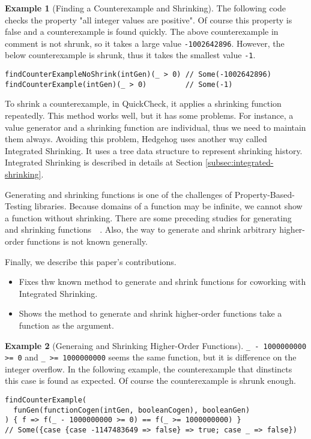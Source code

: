 \documentclass[a4paper,10pt]{article}
\theoremstyle{definition}
\newtheorem{example}{Example}
\begin{document}
\begin{example}[Finding a Counterexample and Shrinking]
The following code checks the property "all integer values are positive".
Of course this property is false and a counterexample is found quickly.
The above counterexample in comment is not shrunk, so it takes a large value \texttt{-1002642896}.
However, the below counterexample is shrunk, thus it takes the smallest value \texttt{-1}.

\begin{verbatim}
findCounterExampleNoShrink(intGen)(_ > 0) // Some(-1002642896)
findCounterExample(intGen)(_ > 0)         // Some(-1)
\end{verbatim}
\end{example}

To shrink a counterexample, in QuickCheck, it applies a shrinking function repeatedly.
This method works well, but it has some problems.
For instance, a value generator and a shrinking function are individual, thus we need to maintain them always.
Avoiding this problem, Hedgehog\cite{hedgehog_online} uses another way called Integrated Shrinking.
It uses a tree data structure to represent shrinking history.
Integrated Shrinking is described in details at Section \ref{subsec:integrated-shrinking}.

Generating and shrinking functions is one of the challenges of Property-Based-Testing libraries.
Because domains of a function may be infinite, we cannot show a function without shrinking.
There are some preceding studies for generating and shrinking functions~\cite{claessen_shrinking_2012,koopman_automatic_2006}~.
Also, the way to generate and shrink arbitrary higher-order functions is not known generally.

Finally, we describe this paper's contributions.

\begin{itemize}
  \item Fixes thw known method to generate and shrink functions for coworking with Integrated Shrinking.
  \item Shows the method to generate and shrink higher-order functions take a function as the argument.
\end{itemize}

\begin{example}[Generaing and Shrinking Higher-Order Functions]\label{exm:shrink}
\texttt{\_ - 1000000000 >= 0} and \texttt{\_ >= 1000000000} seems the same function, but it is difference on the integer overflow.
In the following example, the counterexample that dinstincts this case is found as expected.
Of course the counterexample is shrunk enough.

\begin{verbatim}
findCounterExample(
  funGen(functionCogen(intGen, booleanCogen), booleanGen)
) { f => f(_ - 1000000000 >= 0) == f(_ >= 1000000000) }
// Some({case {case -1147483649 => false} => true; case _ => false})
\end{verbatim}
\end{example}
\end{document}
